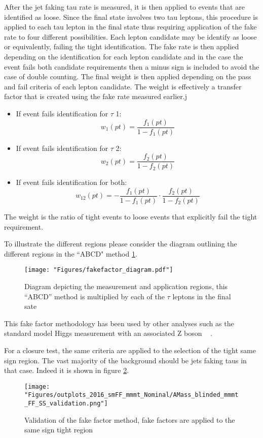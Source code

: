 After the jet faking tau rate is measured, it is then applied to events that are identified as loose. Since the final state involves two tau leptons, this procedure is applied to each tau lepton in the final state thus requiring application of the fake rate to four different possibilities. Each lepton candidate may be identify as loose or equivalently, failing the tight identification. The fake rate is then applied depending on the identification for each lepton candidate and in the case the event fails both candidate requirements then a minus sign is included to avoid the case of double counting.  
The final weight is then applied depending on the pass and fail criteria of each lepton candidate. The weight is effectively a transfer factor that is created using the fake rate measured earlier.j
\begin{itemize}
\item{If event fails identification for $\tau$ 1:\begin{equation}w_1(pt)=\frac{f_{1}(pt)}{1-f_{1}(pt)}\end{equation}}
\item{If event fails identification for $\tau$ 2:\begin{equation}w_2(pt)=\frac{f_{2}(pt)}{1-f_{2}(pt)}\end{equation}}
\item{If event fails identification for both:\begin{equation}w_{12}(pt)=-\frac{f_{1}(pt)}{1-f_{1}(pt)}\cdot\frac{f_{2}(pt)}{1-f_{2}(pt)}\end{equation}}
\end{itemize}
The weight is the ratio of tight events to loose events that explicitly fail the tight requirement.

To illustrate the different regions please consider the diagram outlining the different regions in the ``ABCD" method \ref{fig:fakefactor_reg}. 
\begin{figure}[ht!b]
  \texttt{[image: "Figures/fakefactor\_diagram.pdf"]}
    \caption{\label{fig:fakefactor_reg} Diagram depicting the measurement and application regions, this ``ABCD'' method is multiplied by each of the $\tau$ leptons in the final sate}
\end{figure}

This fake factor methodology has been used by other analyses such as the standard model Higgs measurement with an associated Z boson ~\cite{CMS-PAS-HIG-19-010} . 

For a closure test, the same criteria are applied to the selection of the tight same sign region. The vast majority of the background should be jets faking taus in that case. Indeed it is shown in figure \ref{fig:fakefactor_validation}.
  
\begin{figure}[ht!b]
  \texttt{[image: "Figures/outplots\_2016\_smFF\_mmmt\_Nominal/AMass\_blinded\_mmmt\_FF\_SS\_validation.png"]}
    \caption{\label{fig:fakefactor_validation} Validation of the fake factor method, fake factors are applied to the same sign tight region}
\end{figure}
